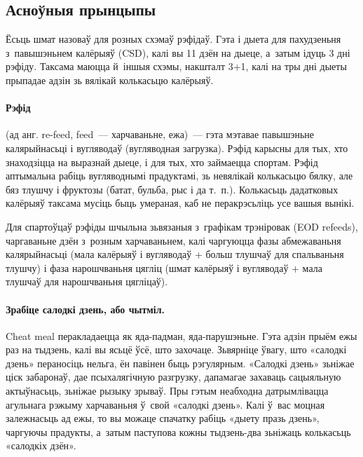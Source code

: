 \subsection{Асноўныя прынцыпы}

Ёсьць шмат назоваў для розных схэмаў рэфідаў. Гэта і дыета для пахудзеньня з~павышэньнем калёрыяў (CSD), калі вы 11 дзён на дыеце, а~затым ідуць 3 дні рэфіду. Таксама маюцца й~іншыя схэмы, накшталт 3+1, калі на тры дні дыеты прыпадае адзін зь вялікай колькасьцю калёрыяў.

\paragraph{Рэфід} (ад анг. re-feed, feed~--- харчаваньне, ежа)~--- гэта мэтавае павышэньне калярыйнасьці і вугляводаў (вугляводная загрузка). Рэфід карысны для тых, хто знаходзіцца на выразнай дыеце, і для тых, хто займаецца спортам. Рэфід аптымальна рабіць вугляводнымі прадуктамі, зь невялікай колькасьцю бялку, але бяз тлушчу і фруктозы (батат, бульба, рыс і да т.~п.). Колькасьць дадатковых калёрыяў таксама мусіць быць умераная, каб не перакрэсьліць усе вашыя вынікі.

Для спартоўцаў рэфіды шчыльна зьвязаныя з~графікам трэніровак (EOD refeeds), чаргаваньне дзён з~розным харчаваньнем, калі чаргуюцца фазы абмежаваньня калярыйнасьці (мала калёрыяў і вугляводаў + больш тлушчаў для спальваньня тлушчу) і фаза нарошчваньня цягліц (шмат калёрыяў і вугляводаў + мала тлушчаў для нарошчваньня цягліцаў).


\paragraph{Зрабіце салодкі дзень, або чытміл.}
Cheat meal перакладаецца як яда-падман, яда-парушэньне. Гэта адзін прыём ежы раз на тыдзень, калі вы ясьцё ўсё, што захочаце. Зьвярніце ўвагу, што «салодкі дзень» пераносіць нельга, ён павінен быць рэгулярным. «Салодкі дзень» зьніжае ціск забаронаў, дае псыхалягічную разгрузку, дапамагае захаваць сацыяльную актыўнасьць, зьніжае рызыку зрываў. Пры гэтым неабходна датрымлівацца агульнага рэжыму харчаваньня ў~свой «салодкі дзень». Калі ў~вас моцная залежнасьць ад ежы, то вы можаце спачатку рабіць «дыету празь дзень», чаргуючы прадукты, а~затым паступова кожны тыдзень-два зьніжаць колькасьць «салодкіх дзён».

